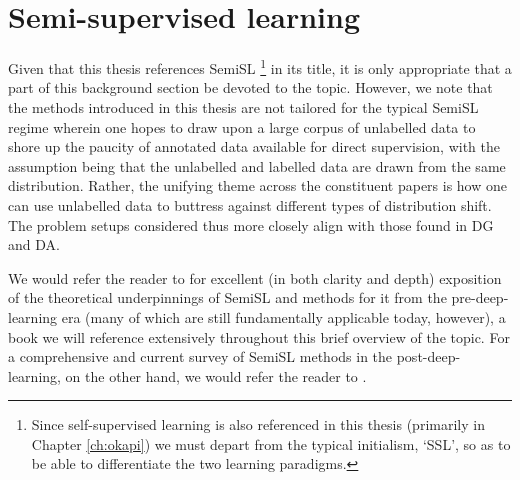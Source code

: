 \section{ Semi-supervised learning }\label{sec:semisl}
%
Given that this thesis references \ac{SemiSL}
%
\footnote{ 
  Since self-supervised learning is also referenced in this thesis (primarily in Chapter
  \ref{ch:okapi}) we must depart from the typical initialism, `SSL', so as to be able to
  differentiate the two learning paradigms.
%
}
%
in its title, it is only appropriate that a part of this background section be devoted to the
topic.
%
However, we note that the methods introduced in this thesis are not tailored for the typical
\ac{SemiSL} regime wherein one hopes to draw upon a large corpus of unlabelled data to shore up the
paucity of annotated data available for direct supervision, with the assumption being that the
unlabelled and labelled data are drawn from the same distribution.
%
Rather, the unifying theme across the constituent papers is how one can use unlabelled data to
buttress against different types of distribution shift.
%
The problem setups considered thus more closely align with those found in \ac{DG} and \ac{DA}. 

We would refer the reader to \cite{chapelle2009semi} for excellent (in both clarity and depth)
exposition of the theoretical underpinnings of \ac{SemiSL} and methods for it from the
pre-deep-learning era (many of which are still fundamentally applicable today, however), a book we
will reference extensively throughout this brief overview of the topic.
%
For a comprehensive and current survey of \ac{SemiSL} methods in the post-deep-learning, on the other
hand, we would refer the reader to \cite{yang2022survey}.
%

